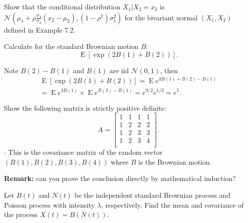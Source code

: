 \documentclass[  11pt]{article}
\newcommand{\optional}{ {\it optional} }
\newcommand{\e}{ \operatorname{E}}
\begin{document}
\begin{ExerciseList}
\Exercise [origin={Thm 7.4, p 251}]
Show that the conditional distribution $X_1 \vert X_2=x_2$ is $\mathcal{N}(\mu_1+\rho \frac{\sigma_1}{\sigma_2} (x_2-\mu_2),
(1-\rho^2)\sigma_1^2)$ for the bivariant normal $(X_1,X_2)$ defined in Example 7.2.

\Exercise  Calculate for the standard Brownian motion $B$:
\[ \e [\exp(2B(1) + B (2))].\]

\Answer
Note $B(2)-B(1)$ and $B(1)$ are iid $\mathcal{N}(0,1)$, then
\[\begin{split}
 \e [\exp(2B(1) + B (2))] = \e e^{3B(1) + B(2)-B(1)} 
 \\
 =\e e^{3B(1)}  \times \e e^{ B(2)-B(1)} 
 = e^{9/2} e^{1/2} =e^5.
 \end{split}
 \]



\Exercise 
Show the following matrix is strictly positive definite:
$$A=\begin{bmatrix}
1 &1& 1& 1 \\
1 &2& 2& 2 \\
1 &2& 3& 3 \\
1 &2& 3& 4 \\
\end{bmatrix}.
$$
\Answer : This is the covariance matrix of the random vector $(B(1), B(2), B(3), B(4)) $
where $B$ is the Brownian motion.
\par
{\bf Remark:} can you prove the conclusion directly by mathematical induction?



\Exercise[name=\optional, difficulty=3] 
Let $B(t)$ and $N(t)$ be the independent  standard Brownian process and Poisson process
with intensity $\lambda$, respectively. Find the mean and covariance of the process 
$X(t) = B(N(t))$. %


\end{ExerciseList}
\end{document}
